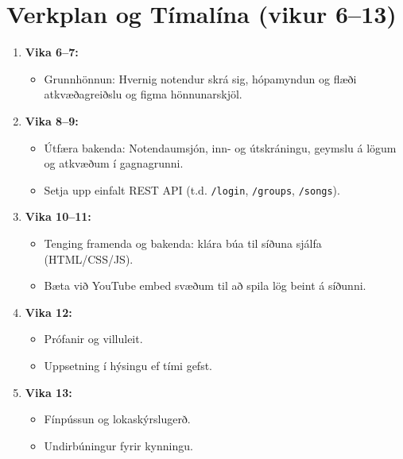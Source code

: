 \documentclass{article}
\begin{document}
\section{Verkplan og Tímalína (vikur 6--13)}
\begin{enumerate}[label=\arabic*.]
    \item \textbf{Vika 6--7:}  
    \begin{itemize}
        \item Grunnhönnun: Hvernig notendur skrá sig, hópamyndun og flæði atkvæðagreiðslu og figma hönnunarskjöl.
    \end{itemize}
    \item \textbf{Vika 8--9:}  
    \begin{itemize}
        \item Útfæra bakenda: Notendaumsjón, inn- og útskráningu, geymslu á lögum og atkvæðum í gagnagrunni.
        \item Setja upp einfalt REST API (t.d. \texttt{/login}, \texttt{/groups}, \texttt{/songs}).
    \end{itemize}
    \item \textbf{Vika 10--11:}  
    \begin{itemize}
        \item Tenging framenda og bakenda: klára búa til síðuna sjálfa (HTML/CSS/JS).
        \item Bæta við YouTube embed svæðum til að spila lög beint á síðunni.
    \end{itemize}
    \item \textbf{Vika 12:}  
    \begin{itemize}
        \item Prófanir og villuleit.
        \item Uppsetning í hýsingu ef tími gefst.
    \end{itemize}
    \item \textbf{Vika 13:}  
    \begin{itemize}
        \item Fínpússun og lokaskýrslugerð.
        \item Undirbúningur fyrir kynningu.
    \end{itemize}
\end{enumerate}

\end{document}

